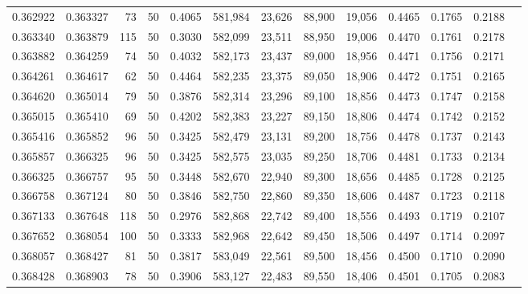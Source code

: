 \begin{tabular}{rrrrrrrrrrrrr}
0.362922 & 0.363327 &    73 &  50 &                                     0.4065 & 581,984 &  23,626 &  88,900 &  19,056 & 0.4465 & 0.1765 & 0.2188 \\
0.363340 & 0.363879 &   115 &  50 &                                     0.3030 & 582,099 &  23,511 &  88,950 &  19,006 & 0.4470 & 0.1761 & 0.2178 \\
0.363882 & 0.364259 &    74 &  50 &                                     0.4032 & 582,173 &  23,437 &  89,000 &  18,956 & 0.4471 & 0.1756 & 0.2171 \\
0.364261 & 0.364617 &    62 &  50 &                                     0.4464 & 582,235 &  23,375 &  89,050 &  18,906 & 0.4472 & 0.1751 & 0.2165 \\
0.364620 & 0.365014 &    79 &  50 &                                     0.3876 & 582,314 &  23,296 &  89,100 &  18,856 & 0.4473 & 0.1747 & 0.2158 \\
0.365015 & 0.365410 &    69 &  50 &                                     0.4202 & 582,383 &  23,227 &  89,150 &  18,806 & 0.4474 & 0.1742 & 0.2152 \\
0.365416 & 0.365852 &    96 &  50 &                                     0.3425 & 582,479 &  23,131 &  89,200 &  18,756 & 0.4478 & 0.1737 & 0.2143 \\
0.365857 & 0.366325 &    96 &  50 &                                     0.3425 & 582,575 &  23,035 &  89,250 &  18,706 & 0.4481 & 0.1733 & 0.2134 \\
0.366325 & 0.366757 &    95 &  50 &                                     0.3448 & 582,670 &  22,940 &  89,300 &  18,656 & 0.4485 & 0.1728 & 0.2125 \\
0.366758 & 0.367124 &    80 &  50 &                                     0.3846 & 582,750 &  22,860 &  89,350 &  18,606 & 0.4487 & 0.1723 & 0.2118 \\
0.367133 & 0.367648 &   118 &  50 &                                     0.2976 & 582,868 &  22,742 &  89,400 &  18,556 & 0.4493 & 0.1719 & 0.2107 \\
0.367652 & 0.368054 &   100 &  50 &                                     0.3333 & 582,968 &  22,642 &  89,450 &  18,506 & 0.4497 & 0.1714 & 0.2097 \\
0.368057 & 0.368427 &    81 &  50 &                                     0.3817 & 583,049 &  22,561 &  89,500 &  18,456 & 0.4500 & 0.1710 & 0.2090 \\
0.368428 & 0.368903 &    78 &  50 &                                     0.3906 & 583,127 &  22,483 &  89,550 &  18,406 & 0.4501 & 0.1705 & 0.2083 \\

\end{tabular}
